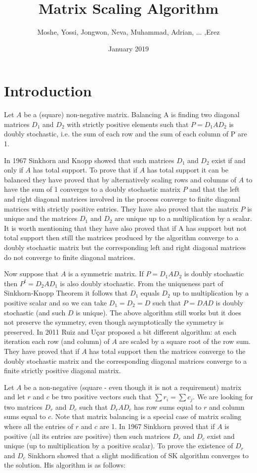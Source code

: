 \documentclass{article}
\title{Matrix Scaling Algorithm}
\author{Moshe, Yossi, Jongwon, Neva, Muhammad, Adrian, ... ,Erez}
\date{January 2019}
\begin{document}
\maketitle

\section{Introduction}

Let $A$ be a (square) non-negative matrix. Balancing A is finding two diagonal matrices $D_1$ and $D_2$ with strictly positive elements such that $P = D_1 A D_2$ is doubly stochastic, i.e. the sum of each row and the sum of each column of P are 1.  

In 1967 Sinkhorn and Knopp \cite{sinkhorn1967concerning} showed that such matrices $D_1$ and $D_2$ exist if and only if $A$ has total support. To prove that if $A$ has total support it can be balanced they have proved that by alternatively scaling rows and columns of $A$ to have the sum of 1 converges to a doubly stochastic matrix $P$ and that the left and right diagonal matrices involved in the process converge to finite diagonal matrices with strictly positive entries. They have also proved that the matrix $P$ is unique and the matrices $D_1$ and $D_2$ are unique up to a multiplication by a scalar. It is worth mentioning that they have also proved that if A has support but not total support then still the matrices produced by the algorithm converge to a doubly stochastic matrix but the corresponding left and right diagonal matrices do not converge to finite diagonal matrices.  

Now suppose that $A$ is a symmetric matrix. If $P = D_1 A D_2$ is doubly stochastic then $P^t = D_2 A D_1$ is also doubly stochastic. From the uniqueness part of Sinkhorn-Knopp Theorem it follows that $D_1$ equals $D_2$ up to multiplication by a positive scalar and so we can take $D_1 = D_2 = D$ such that $P = D A D$ is doubly stochastic (and such $D$ is unique). The above algorithm still works but it does not preserve the symmetry, even though asymptotically the symmetry is preserved. In 2011 Ruiz and Uçar \cite{uccar2011symmetry} proposed a bit different algorithm: at each iteration each row (and column) of $A$ are scaled by a square root of the row sum. They have proved that if $A$ has total support then the matrices converge to the doubly stochastic matrix and the corresponding diagonal matrices converge to a finite strictly positive diagonal matrix.

 Let $A$ be a non-negative (square - even though it is not a requirement) matrix and let $r$ and $c$ be two positive vectors such that $\sum r_i = \sum c_j$.  We are looking for two matrices $D_r$ and $D_c$ such that $D_r A D_c$ has row sums equal to $r$ and column sums equal to $c$. Note that matrix balancing is a special case of matrix scaling where all the entries of $r$ and $c$ are 1. In 1967 Sinkhorn \cite{sinkhorn1967diagonal} proved that if $A$ is positive (all its entries are positive) then such matrices $D_r$ and $D_c$ exist and unique (up to multiplication by a positive scalar). To prove the existence of $D_r$ and $D_c$ Sinkhorn showed that a slight modification of SK algorithm converges to the solution. His algorithm is as follows:
 
\end{document}
